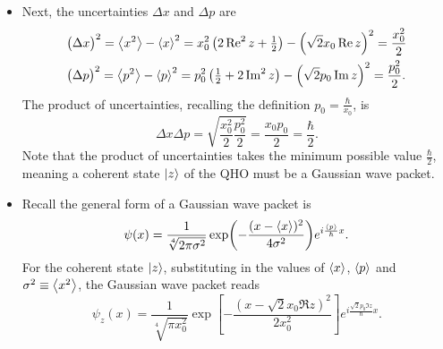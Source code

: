 \documentclass[11pt, a4paper]{article}
\begin{document}
\begin{itemize}
	\item Next, the uncertainties $ \Delta x $ and $ \Delta p $ are
	\begin{align*}
		&\big(\Delta x\big)^{2} = \ev{x^{2}} - \ev{x}^{2} = x_{0}^{2}\left(2 \Re^{2}z + \tfrac{1}{2}\right) - \left(\sqrt{2}x_{0}\Re z\right)^{2} = \frac{x_{0}^{2}}{2}\\
		&\big(\Delta p\big)^{2} = \ev{p^{2}} - \ev{p}^{2} = p_{0}^{2}\left(\tfrac{1}{2} + 2 \Im^{2}z\right) - \left(\sqrt{2}p_{0}\Im z\right)^{2} = \frac{p_{0}^{2}}{2}.
	\end{align*}
	The product of uncertainties, recalling the definition $ p_{0} = \frac{\hbar}{x_{0}} $, is 
	\begin{equation*}
		\Delta x \Delta p = \sqrt{\frac{x_{0}^{2}}{2}\frac{p_{0}^{2}}{2}} = \frac{x_{0}p_{0}}{2} = \frac{\hbar}{2}.
	\end{equation*}
	Note that the product of uncertainties takes the minimum possible value $ \frac{\hbar}{2} $, meaning a coherent state $ \ket{z} $ of the QHO must be a Gaussian wave packet. 
	
	\item Recall the general form of a Gaussian wave packet is
	\begin{equation*}
		\psi(x) = \frac{1}{\sqrt[4]{2\pi\sigma^{2}}}\exp(-\frac{(x-\ev{x})^{2}}{4\sigma^{2}})e^{i \frac{\ev{p}}{\hbar}x}.
	\end{equation*}
	For the coherent state $ \ket{z} $, substituting in the values of $ \ev{x} $, $ \ev{p} $ and $ \sigma^{2} \equiv \ev{x^{2}} $, the Gaussian wave packet reads
	\begin{equation*}
		\psi_{z}(x) = \frac{1}{\sqrt[4]{\pi x_{0}^{2}}}\exp\left[-\frac{\left(x-\sqrt{2}x_{0}\Re z\right)^{2}}{2x_{0}^{2}}\right]e^{i \frac{\sqrt{2}p_{0}\Im z}{\hbar}x}.
	\end{equation*}
	

\end{itemize}
\end{document}
